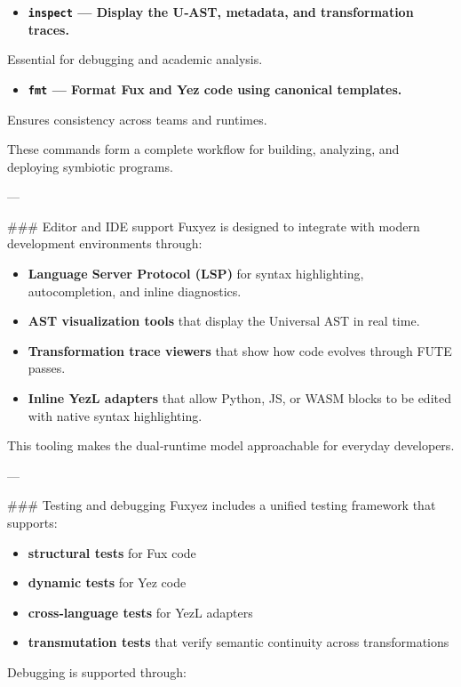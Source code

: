 \begin{enumerate}
\begin{itemize}
  \item \textbf{\texttt{inspect} — Display the U‑AST, metadata, and transformation traces.}  
\end{itemize}
  Essential for debugging and academic analysis.

\begin{itemize}
  \item \textbf{\texttt{fmt} — Format Fux and Yez code using canonical templates.}  
\end{itemize}
  Ensures consistency across teams and runtimes.

These commands form a complete workflow for building, analyzing, and deploying symbiotic programs.

---

\#\#\# Editor and IDE support  
Fuxyez is designed to integrate with modern development environments through:

\begin{itemize}
  \item \textbf{Language Server Protocol (LSP)} for syntax highlighting, autocompletion, and inline diagnostics.  
  \item \textbf{AST visualization tools} that display the Universal AST in real time.  
  \item \textbf{Transformation trace viewers} that show how code evolves through FUTE passes.  
  \item \textbf{Inline YezL adapters} that allow Python, JS, or WASM blocks to be edited with native syntax highlighting.
\end{itemize}

This tooling makes the dual‑runtime model approachable for everyday developers.

---

\#\#\# Testing and debugging  
Fuxyez includes a unified testing framework that supports:

\begin{itemize}
  \item \textbf{structural tests} for Fux code  
  \item \textbf{dynamic tests} for Yez code  
  \item \textbf{cross‑language tests} for YezL adapters  
  \item \textbf{transmutation tests} that verify semantic continuity across transformations  
\end{itemize}

Debugging is supported through:


\end{enumerate}
